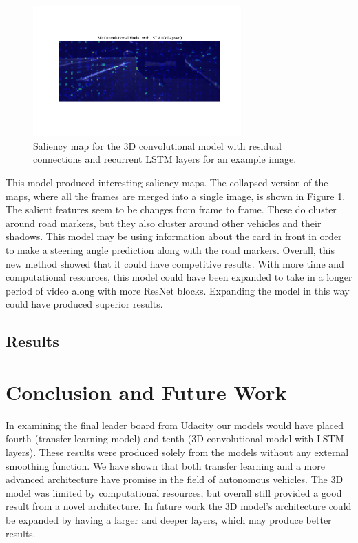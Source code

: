 \documentclass[10pt,twocolumn,letterpaper]{article}
\begin{document}

\begin{figure}[!htb]
	\includegraphics[width=8cm]{3d_full_v2_collapsed.png}
	\centering
	\caption{Saliency map for the 3D convolutional model with residual connections and recurrent LSTM layers for an example image.}
	\label{3d_collapse}
\end{figure}

This model produced interesting saliency maps. The collapsed version of the maps, where all the frames are merged into a single image, is shown in Figure \ref{3d_collapse}. The salient features seem to be changes from frame to frame. These do cluster around road markers, but they also cluster around other vehicles and their shadows. This model may be using information about the card in front in order to make a steering angle prediction along with the road markers. Overall, this new method showed that it could have competitive results. With more time and computational resources, this model could have been expanded to take in a longer period of video along with more ResNet blocks. Expanding the model in this way could have produced superior results.




\subsection{Results}



\section{Conclusion and Future Work}

In examining the final leader board from Udacity our models would have placed fourth (transfer learning model) and tenth (3D convolutional model with LSTM layers). These results were produced solely from the models without any external smoothing function. We have shown that both transfer learning and a more advanced architecture have promise in the field of autonomous vehicles. The 3D model was limited by computational resources, but overall still provided a good result from a novel architecture. In future work the 3D model's architecture could be expanded by having a larger and deeper layers, which may produce better results.
\end{document}
